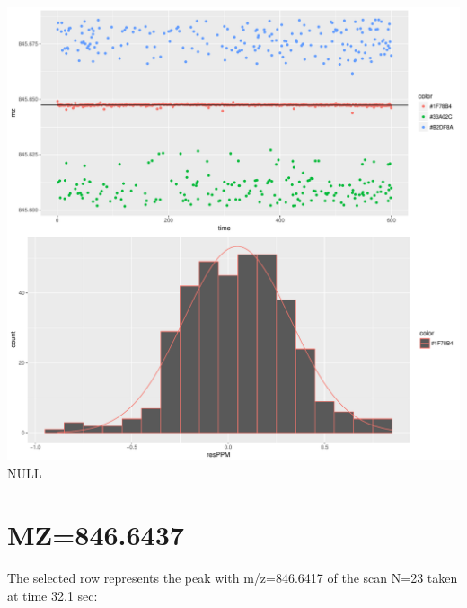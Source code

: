 \documentclass[]{article}
\newenvironment{Shaded}{\begin{snugshade}}{\end{snugshade}}
\newcommand{\KeywordTok}[1]{\textcolor[rgb]{0.13,0.29,0.53}{\textbf{#1}}}
\newcommand{\FloatTok}[1]{\textcolor[rgb]{0.00,0.00,0.81}{#1}}
\newcommand{\OperatorTok}[1]{\textcolor[rgb]{0.81,0.36,0.00}{\textbf{#1}}}
\newcommand{\NormalTok}[1]{#1}
\begin{document}
\includegraphics{Supplementary_document_files/figure-latex/filter.lm.845-1.pdf}
NULL

\section{MZ=846.6437}\label{mz846.6437}

\begin{Shaded}
\end{Shaded}

The selected row represents the peak with m/z=846.6417 of the scan N=23
taken at time 32.1 sec:

\begin{Shaded}
\end{Shaded}
\end{document}
